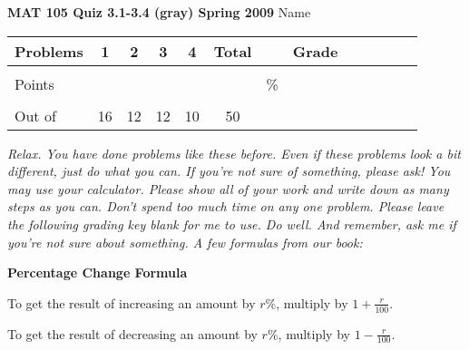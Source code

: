 \documentclass[12pt]{article}
\begin{document}
{\bf MAT 105 Quiz 3.1-3.4 (gray) Spring 2009} \hspace{.4in} {\large Name} \hrulefill

\hrulefill


\begin{center}

\begin{tabular}
{|l|c|c|c|c|c|c|c|c|c|c|c|c|} \hline

 Problems & \hspace{5 pt} 1 \hspace{5 pt}  & \hspace{5 pt} 2 \hspace{5 pt} & \hspace{5 pt} 3 \hspace{5 pt} & \hspace{5 pt} 4 \hspace{5 pt} &  \hspace{5 pt} Total  \hspace{5 pt} & &  \hspace{5 pt} Grade \hspace{5 pt}  \\ \hline
&&&&& &&\\  
Points &&&&& &    \hspace{.8in}\% &  \\ 
&&&&& && \\  \hline
Out of & 16 & 12  & 12 & 10 &50 & & \\ \hline

\end {tabular}
 
\end{center}

 \emph{Relax.  You have done problems like these before.  Even if these problems look a bit different, just do what you can.  If you're not sure of something, please ask! You may use your calculator.  Please show all of your work and write down as many steps as you can.  Don't spend too much time on any one problem.  Please leave the following grading key blank for me to use.  Do well.  And remember, ask me if you're not sure about something. A few formulas from our book:}
  \vspace{.2in}
 
  \begin{center}
\textbf{Percentage Change Formula}
\vspace{.1in}

To get the result of increasing an amount by $r$\%, multiply by $1+\frac{r}{100}.$
\vspace{.1in}

To get the result of decreasing an amount by $r$\%, multiply by $1-\frac{r}{100}.$
 \end{center}
 
\end{document}
